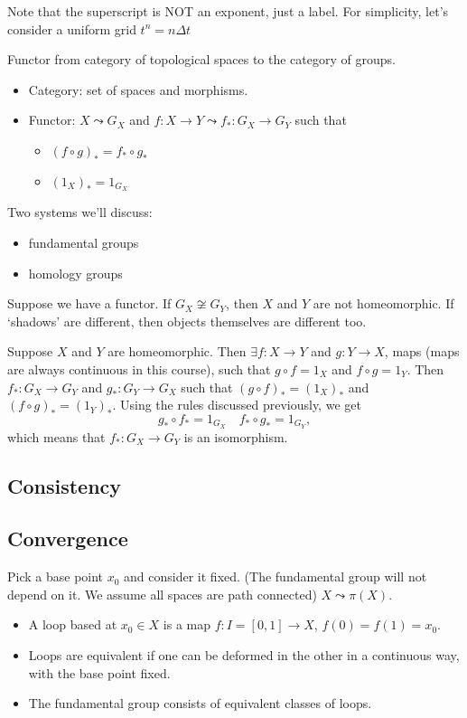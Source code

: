Note that the superscript is NOT an exponent, just a label. For simplicity, let's consider a uniform grid $t^n = n\Delta t$

Functor from category of topological spaces to the category of groups.
\begin{itemize}
    \item Category: set of spaces and morphisms.
    \item Functor: $X \leadsto G_X$ and  $f:X\to Y \leadsto f_*: G_X \to  G_Y$ such that
        \begin{itemize}
            \item $(f \circ g)_* = f_* \circ g_* $
            \item $(1_X)_* = 1_{G_X}$
        \end{itemize}
\end{itemize}

Two systems we'll discuss:
\begin{itemize}
    \item fundamental groups
    \item homology groups
\end{itemize}


\begin{eg}
    Suppose we have a functor.
    If $G_X \not\cong G_Y$, then  $X$ and  $Y$ are not homeomorphic.
    If `shadows' are different, then objects themselves are different too.
\end{eg}
\begin{explanation}
    Suppose $X$ and $Y$ are homeomorphic.
    Then $\exists f: X \to  Y$ and $g: Y \to  X$, maps (maps are always continuous in this course), such that $g  \circ f = 1_X$ and $f \circ g = 1_Y$.
    Then $f_*: G_X \to G_Y$ and $g_*: G_Y \to  G_X$ such that $(g \circ f)_* = (1_X)_*$ and  $(f \circ g)_* = (1_Y)_*$. Using the rules discussed previously, we get
    \[
    g_*  \circ f_* = 1_{G_X} \quad f_*  \circ  g_* = 1_{G_Y}
    ,\] 
    which means that $f_* : G_X \to  G_Y$ is an isomorphism.
\end{explanation}

\subsection{Consistency}

\subsection{Convergence}
Pick a base point $x_0$ and consider it fixed. (The fundamental group will not depend on it. We assume all spaces are path connected)
$X \leadsto \pi(X)$.
\begin{itemize}
    \item A loop based at $x_0 \in X$ is a map $f: I = [0, 1] \to X$, $f(0) = f(1) = x_0$.
    \item Loops are equivalent if one can be deformed in the other in a continuous way, with the base point fixed.
    \item The fundamental group consists of equivalent classes of loops.
\end{itemize}

